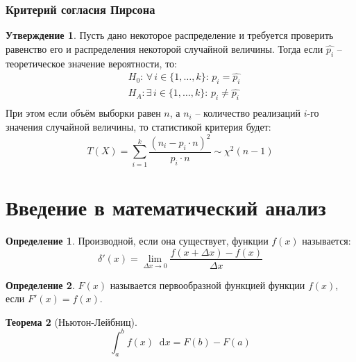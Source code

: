 \documentclass[12pt]{article}
\theoremstyle{definition}
\newtheorem{theorem}{Теорема}[section]
\newtheorem{definition}{Определение}
\newtheorem{statement}[theorem]{Утверждение}
\newcommand*\diff{\mathop{}\!\mathrm{d}}
\begin{document}
\subsubsection{Критерий согласия Пирсона}

\begin{statement}
    Пусть дано некоторое распределение и требуется проверить равенство его и распределения некоторой случайной величины. Тогда если $\hat{p_i}$ – теоретическое значение вероятности, то:
    \begin{align*}
        &H_0:\, \forall\, i\in\{1,\ldots,k\}:\,p_i=\hat{p_i}\\
        &H_A: \exists\, i\in\{1,\ldots,k\}:\,p_i\neq\hat{p_i}\\
    \end{align*}
    При этом если объём выборки равен $n$, а $n_i$ – количество реализаций $i$-го значения случайной величины, то статистикой критерия будет:
    $$T(X)=\sum_{i=1}^{k}\frac{(n_i-p_i\cdot n)^2}{p_i\cdot n}\sim \chi^2(n-1)$$
\end{statement}

\section{Введение в математический анализ}

\begin{definition}
    Производной, если она существует, функции $f(x)$ называется:
    $$\delta'(x)=\lim_{\Delta x\to0}\frac{f(x+\Delta x)-f(x)}{\Delta x}$$
\end{definition}
\begin{definition}
    $F(x)$ называется первообразной функцией функции $f(x)$, если $F'(x)=f(x)$.
\end{definition}
\begin{theorem}[Ньютон-Лейбниц]
    $$\int_{a}^{b}f(x)\diff x=F(b)-F(a)$$
\end{theorem}
\end{document}
